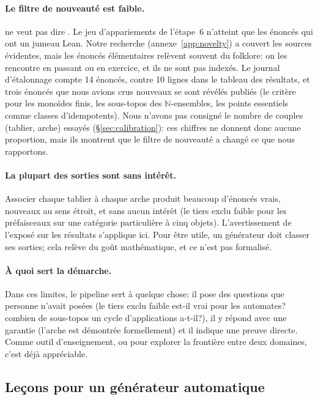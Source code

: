 \paragraph{Le filtre de nouveauté est faible.}  ne veut pas dire . Le jeu d'appariements de l'étape~6 n'atteint que les énoncés qui ont un jumeau Lean. Notre recherche (annexe~\ref{app:novelty}) a couvert les sources évidentes, mais les énoncés élémentaires relèvent souvent du folklore: on les rencontre en passant ou en exercice, et ils ne sont pas indexés. Le journal d'étalonnage compte 14 énoncés, contre 10 lignes dans le tableau des résultats, et trois énoncés que nous avions crus nouveaux se sont révélés publiés (le critère pour les monoïdes finis, les sous-topos des $\mathbb N$-ensembles, les points essentiels comme classes d'idempotents). Nous n'avons pas consigné le nombre de couples (tablier, arche) essayés (\S\ref{sec:calibration}): ces chiffres ne donnent donc aucune proportion, mais ils montrent que le filtre de nouveauté a changé ce que nous rapportons.

\paragraph{La plupart des sorties sont sans intérêt.} Associer chaque tablier à chaque arche produit beaucoup d'énoncés vrais, nouveaux au sens étroit, et sans aucun intérêt (le tiers exclu faible pour les préfaisceaux sur une catégorie particulière à cinq objets). L'avertissement de l'exposé sur les résultats  s'applique ici. Pour être utile, un générateur doit classer ses sorties; cela relève du goût mathématique, et ce n'est pas formalisé.

\paragraph{À quoi sert la démarche.} Dans ces limites, le pipeline sert à quelque chose: il pose des questions que personne n'avait posées (le tiers exclu faible est-il vrai pour les automates? combien de sous-topos un cycle d'applications a-t-il?), il y répond avec une garantie (l'arche est démontrée formellement) et il indique une preuve directe. Comme outil d'enseignement, ou pour explorer la frontière entre deux domaines, c'est déjà appréciable.

\subsection{Leçons pour un générateur automatique}

